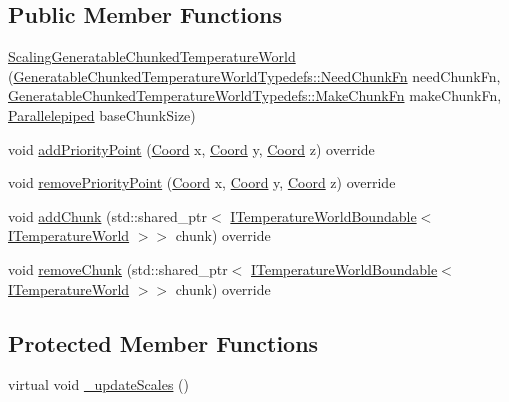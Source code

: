 \subsection*{Public Member Functions}
\begin{DoxyCompactItemize}
\item 
\hyperlink{class_scaling_generatable_chunked_temperature_world_a48b49e12d9005baf785c8d8782c240ad}{Scaling\-Generatable\-Chunked\-Temperature\-World} (\hyperlink{namespace_generatable_chunked_temperature_world_typedefs_a07d38658571f8f09839bc1bc8b105107}{Generatable\-Chunked\-Temperature\-World\-Typedefs\-::\-Need\-Chunk\-Fn} need\-Chunk\-Fn, \hyperlink{namespace_generatable_chunked_temperature_world_typedefs_a719e4469a105a21a76ed22274639c03a}{Generatable\-Chunked\-Temperature\-World\-Typedefs\-::\-Make\-Chunk\-Fn} make\-Chunk\-Fn, \hyperlink{struct_parallelepiped}{Parallelepiped} base\-Chunk\-Size)
\item 
void \hyperlink{class_scaling_generatable_chunked_temperature_world_ac8135352da17faeb9c41f1273630aa41}{add\-Priority\-Point} (\hyperlink{struct_coord}{Coord} x, \hyperlink{struct_coord}{Coord} y, \hyperlink{struct_coord}{Coord} z) override
\item 
void \hyperlink{class_scaling_generatable_chunked_temperature_world_aff6258637594e1b5b0e25ba628d22b20}{remove\-Priority\-Point} (\hyperlink{struct_coord}{Coord} x, \hyperlink{struct_coord}{Coord} y, \hyperlink{struct_coord}{Coord} z) override
\item 
void \hyperlink{class_scaling_generatable_chunked_temperature_world_a5ec1b1a2a5e058bf57bd7918fcc5a35b}{add\-Chunk} (std\-::shared\-\_\-ptr$<$ \hyperlink{class_i_temperature_world_boundable}{I\-Temperature\-World\-Boundable}$<$ \hyperlink{class_i_temperature_world}{I\-Temperature\-World} $>$$>$ chunk) override
\item 
void \hyperlink{class_scaling_generatable_chunked_temperature_world_ac3ae4d696d934b925076eeab88658978}{remove\-Chunk} (std\-::shared\-\_\-ptr$<$ \hyperlink{class_i_temperature_world_boundable}{I\-Temperature\-World\-Boundable}$<$ \hyperlink{class_i_temperature_world}{I\-Temperature\-World} $>$$>$ chunk) override
\end{DoxyCompactItemize}
\subsection*{Protected Member Functions}
\begin{DoxyCompactItemize}
\item 
virtual void \hyperlink{class_scaling_generatable_chunked_temperature_world_aabf0380970fd95dfa8d88298f0ae07e9}{\-\_\-update\-Scales} ()
\end{DoxyCompactItemize}
